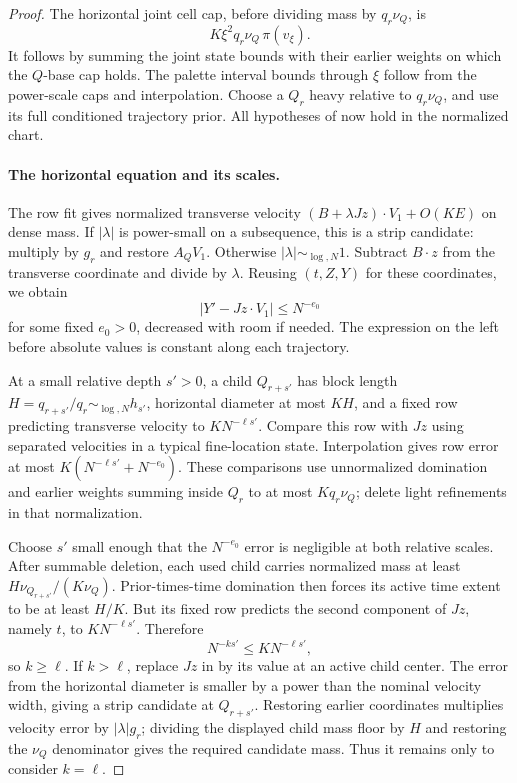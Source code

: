 \begin{proof}
The horizontal joint cell cap, before dividing mass by
\(q_r\nu_Q\), is
\[
 K\xi^2q_r\nu_Q\,\pi(v_\xi).
\]
It follows by summing the joint state bounds with their earlier
weights on which the \(Q\)-base cap holds.  The palette interval
bounds through \(\xi\) follow from the power-scale caps and
interpolation.  Choose a \(Q_r\) heavy relative to
\(q_r\nu_Q\), and use its full conditioned trajectory prior.
All hypotheses of  now hold in the normalized
chart.

\paragraph{The horizontal equation and its scales.}
The row fit gives normalized transverse velocity
\((B+\lambda Jz)\cdot V_1+O(KE)\) on dense mass.
If \(|\lambda|\) is power-small on a subsequence, this is a
strip candidate: multiply by \(g_r\) and restore \(A_QV_1\).
Otherwise \(|\lambda|\sim_{\log,N}1\).  Subtract \(B\cdot z\)
from the transverse coordinate and divide by \(\lambda\).
Reusing \((t,Z,Y)\) for these coordinates, we obtain
\begin{equation}\label{a06:horizontal-equation}
 |Y'-Jz\cdot V_1|\le N^{-e_0}
\end{equation}
for some fixed \(e_0>0\), decreased with room if needed.
The expression on the left before absolute values is constant
along each trajectory.

At a small relative depth \(s'>0\), a child \(Q_{r+s'}\) has
block length \(H=q_{r+s'}/q_r\sim_{\log,N}h_{s'}\),
horizontal diameter at most \(KH\), and a fixed row predicting
transverse velocity to \(KN^{-\ell s'}\).  Compare this row
with \(Jz\) using separated velocities in a typical fine-location
state.  Interpolation gives row error at most
\(K(N^{-\ell s'}+N^{-e_0})\).  These comparisons use
unnormalized domination and earlier weights summing inside
\(Q_r\) to at most \(Kq_r\nu_Q\); delete light refinements
in that normalization.

Choose \(s'\) small enough that the \(N^{-e_0}\) error is
negligible at both relative scales.  After summable deletion, each
used child carries normalized mass at least
\(H\nu_{Q_{r+s'}}/(K\nu_Q)\).  Prior-times-time domination
then forces its active time extent to be at least \(H/K\).
But its fixed row predicts the second component of \(Jz\),
namely \(t\), to \(KN^{-\ell s'}\).  Therefore
\[
 N^{-ks'}\le KN^{-\ell s'},
\]
so \(k\ge\ell\).  If \(k>\ell\), replace \(Jz\) in
 by its value at an active child
center.  The error from the horizontal diameter is smaller by a
power than the nominal velocity width, giving a strip candidate
at \(Q_{r+s'}\).  Restoring earlier coordinates multiplies
velocity error by \(|\lambda|g_r\); dividing the displayed
child mass floor by \(H\) and restoring the \(\nu_Q\)
denominator gives the required candidate mass.  Thus it remains
only to consider \(k=\ell\).


\end{proof}
